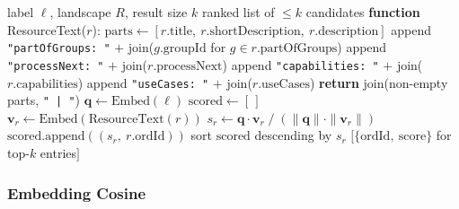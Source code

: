 \begin{algorithm}[!t]\small
  \caption{Embedding Cosine (\texttt{src/methods/method\_a.py})}
  \label{alg:method-a}
  \begin{algorithmic}[1]
  \REQUIRE label $\ell$, landscape $R$, result size $k$
  \ENSURE ranked list of $\le k$ candidates
  \medskip
  \STATE \textbf{function} ResourceText($r$):
  \STATE \quad $\text{parts} \leftarrow [r.\text{title},\ r.\text{shortDescription},\ r.\text{description}]$
    \STATE \quad append \texttt{"partOfGroups: "} $+$ join($g.\text{groupId}$ for $g \in r.\text{partOfGroups}$)
  \ENDIF
    \STATE \quad append \texttt{"processNext: "} $+$ join($r.\text{processNext}$)
  \ENDIF
    \STATE \quad append \texttt{"capabilities: "} $+$ join($r.\text{capabilities}$)
  \ENDIF
    \STATE \quad append \texttt{"useCases: "} $+$ join($r.\text{useCases}$)
  \ENDIF
  \STATE \quad \textbf{return} join(non-empty parts, \texttt{" | "})
  \medskip
  \STATE $\mathbf{q} \leftarrow \mathrm{Embed}(\ell)$ 
  \STATE $\text{scored} \leftarrow [\,]$
    \STATE $\mathbf{v}_r \leftarrow \mathrm{Embed}(\mathrm{ResourceText}(r))$ 
    \STATE $s_r \leftarrow \mathbf{q} \cdot \mathbf{v}_r \;/\; (\|\mathbf{q}\| \cdot \|\mathbf{v}_r\|)$ 
    \STATE $\text{scored}.\text{append}((s_r,\ r.\text{ordId}))$
  \ENDFOR
  \STATE sort $\text{scored}$ descending by $s_r$
  \RETURN $[\{\text{ordId},\ \text{score}\}$ for top-$k$ entries$]$
  \end{algorithmic}
  \end{algorithm}%

\subsubsection{Embedding Cosine}

